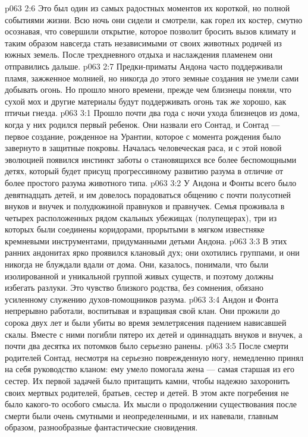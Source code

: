 \vs p063 2:6 Это был один из самых радостных моментов их короткой, но полной событиями жизни. Всю ночь они сидели и смотрели, как горел их костер, смутно осознавая, что совершили открытие, которое позволит бросить вызов климату и таким образом навсегда стать независимыми от своих животных родичей из южных земель. После трехдневного отдыха и наслаждения пламенем они отправились дальше.
\vs p063 2:7 Предки\hyp{}приматы Андона часто поддерживали пламя, зажженное молнией, но никогда до этого земные создания не умели сами добывать огонь. Но прошло много времени, прежде чем близнецы поняли, что сухой мох и другие материалы будут поддерживать огонь так же хорошо, как птичьи гнезда.
\vs p063 3:1 Прошло почти два года с ночи ухода близнецов из дома, когда у них родился первый ребенок. Они назвали его Сонтад, и Сонтад --- первое создание, рожденное на Урантии, которое с момента рождения было завернуто в защитные покровы. Началась человеческая раса, и с этой новой эволюцией появился инстинкт заботы о становящихся все более беспомощными детях, который будет присущ прогрессивному развитию разума в отличие от более простого разума животного типа.
\vs p063 3:2 У Андона и Фонты всего было девятнадцать детей, и им довелось порадоваться общению с почти полусотней внуков и внучек и полудюжиной правнуков и правнучек. Семья проживала в четырех расположенных рядом скальных убежищах (полупещерах), три из которых были соединены коридорами, прорытыми в мягком известняке кремневыми инструментами, придуманными детьми Андона.
\vs p063 3:3 В этих ранних андонитах ярко проявился клановый дух; они охотились группами, и они никогда не блуждали вдали от дома. Они, казалось, понимали, что были изолированной и уникальной группой живых существ, и поэтому должны избегать разлуки. Это чувство близкого родства, без сомнения, обязано усиленному служению духов\hyp{}помощников разума.
\vs p063 3:4 \pc Андон и Фонта непрерывно работали, воспитывая и взращивая свой клан. Они прожили до сорока двух лет и были убиты во время землетрясения падением нависавшей скалы. Вместе с ними погибли пятеро их детей и одиннадцать внуков и внучек, а почти два десятка их потомков было серьезно ранены.
\vs p063 3:5 После смерти родителей Сонтад, несмотря на серьезно поврежденную ногу, немедленно принял на себя руководство кланом: ему умело помогала жена --- самая старшая из его сестер. Их первой задачей было притащить камни, чтобы надежно захоронить своих мертвых родителей, братьев, сестер и детей. В этом акте погребения не было какого\hyp{}то особого смысла. Их мысли о продолжении существования после смерти были очень смутными и неопределенными, и их навевали, главным образом, разнообразные фантастические сновидения.
